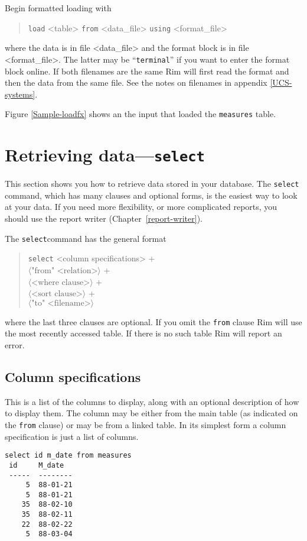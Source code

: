 \documentclass[11pt,a4paper]{report}
\def\opt#1{$\langle \mbox{#1} \rangle$}
\def\I{\index}
\begin{document}
Begin formatted loading with
\begin{verse}
\verb|load| <table> \verb|from| <data\_file> \verb|using| <format\_file>
\end{verse}
where the data is in file <data\_file> and the format block
is in file <format\_file>. The latter may be ``\verb|terminal|''
if you want to enter the format block online.
If both filenames are the same Rim will first read the
format and then the data from the same file.
See the notes on filenames in appendix \ref{UCS-systems}.
 
Figure \ref{Sample-loadfx} shows an the input that loaded
the \verb|measures| table.
\I{load@"load"|)}
 
 
\section{Retrieving data---{\tt select}}
%
\I{select@"select"|}
This section shows you how to retrieve data stored in
your database.
The \verb|select| command, which has many clauses and optional forms,
is the easiest way to look at your data.
If you need more flexibility, or more complicated reports,
you should use the report writer (Chapter~\ref{report-writer}).

The \verb|select|command has the general format
\begin{verse}
  \verb|select| <column specifications> + \\
  \qquad \opt{"from" <relation>} + \\
  \qquad \opt{<where clause>} + \\
  \qquad \opt{<sort clause>} + \\
  \qquad \opt{"to" <filename>}
\end{verse}
where the last three clauses are optional.
If you omit the \verb|from| clause Rim will use the most recently
accessed table.  If there is no such table
Rim will report an error.
 
\subsection{Column specifications}
%
This is a list of the columns to display, along with an optional
description of how to display them.  The column may be either
from the main table (as indicated on the \verb|from| clause) or may
be from a linked\I{link} table.
In its simplest form a column specification is just a list of columns.
 

\begin{verbatim}
select id m_date from measures
 id     M_date
 -----  --------
     5  88-01-21
     5  88-01-21
    35  88-02-10
    35  88-02-11
    22  88-02-22
     5  88-03-04
\end{verbatim}
 
\end{document}
